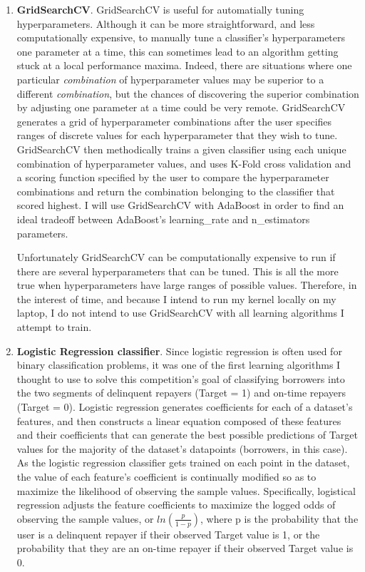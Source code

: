 \documentclass[12pt, letterpaper]{article}
\begin{document}
\begin{enumerate}
  \item \textbf{GridSearchCV}. GridSearchCV is useful for automatially tuning hyperparameters. Although it can be more straightforward, and less computationally expensive, to manually tune a classifier's hyperparameters one parameter at a time, this can sometimes lead to an algorithm getting stuck at a local performance maxima. Indeed, there are situations where one particular \textit{combination} of hyperparameter values may be superior to a different \textit{combination}, but the chances of discovering the superior combination by adjusting one parameter at a time could be very remote. GridSearchCV generates a grid of hyperparameter combinations after the user specifies ranges of discrete values for each hyperparameter that they wish to tune. GridSearchCV then methodically trains a given classifier using each unique combination of hyperparameter values, and uses K-Fold cross validation and a scoring function specified by the user to compare the hyperparameter combinations and return the combination belonging to the classifier that scored highest. I will use GridSearchCV with AdaBoost in order to find an ideal tradeoff between AdaBoost's learning_rate and n_estimators parameters.

  Unfortunately GridSearchCV can be computationally expensive to run if there are several hyperparameters that can be tuned. This is all the more true when hyperparameters have large ranges of possible values. Therefore, in the interest of time, and because I intend to run my kernel locally on my laptop, I do not intend to use GridSearchCV with all learning algorithms I attempt to train.
  \item \textbf{Logistic Regression classifier}. Since logistic regression is often used for binary classification problems, it was one of the first learning algorithms I thought to use to solve this competition's goal of classifying borrowers into the two segments of delinquent repayers (Target = 1) and on-time repayers (Target = 0). Logistic regression generates coefficients for each of a dataset's features, and then constructs a linear equation composed of these features and their coefficients that can generate the best possible predictions of Target values for the majority of the dataset's datapoints (borrowers, in this case). As the logistic regression classifier gets trained on each point in the dataset, the value of each feature's coefficient is continually modified so as to maximize the likelihood of observing the sample values. Specifically, logistical regression adjusts the feature coefficients to maximize the logged odds of observing the sample values, or $ln(\frac{p}{1-p})$, where p is the probability that the user is a delinquent repayer if their observed Target value is 1, or the probability that they are an on-time repayer if their observed Target value is 0.


\end{enumerate}
\end{document}
